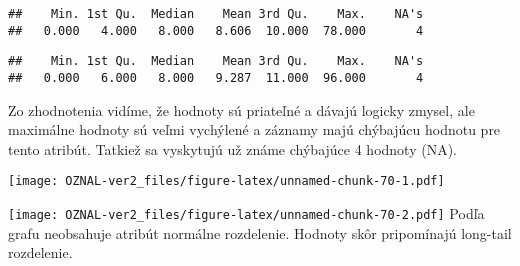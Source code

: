 \documentclass[
]{article}
\newenvironment{Shaded}{\begin{snugshade}}{\end{snugshade}}
\newcommand{\AttributeTok}[1]{\textcolor[rgb]{0.77,0.63,0.00}{#1}}
\newcommand{\FunctionTok}[1]{\textcolor[rgb]{0.00,0.00,0.00}{#1}}
\newcommand{\NormalTok}[1]{#1}
\newcommand{\SpecialCharTok}[1]{\textcolor[rgb]{0.00,0.00,0.00}{#1}}
\newcommand{\StringTok}[1]{\textcolor[rgb]{0.31,0.60,0.02}{#1}}
\begin{document}
\begin{Shaded}
\end{Shaded}

\begin{verbatim}
##    Min. 1st Qu.  Median    Mean 3rd Qu.    Max.    NA's 
##   0.000   4.000   8.000   8.606  10.000  78.000       4
\end{verbatim}

\begin{Shaded}
\end{Shaded}

\begin{verbatim}
##    Min. 1st Qu.  Median    Mean 3rd Qu.    Max.    NA's 
##   0.000   6.000   8.000   9.287  11.000  96.000       4
\end{verbatim}

Zo zhodnotenia vidíme, že hodnoty sú priateľné a dávajú logicky zmysel,
ale maximálne hodnoty sú veľmi vychýlené a záznamy majú chýbajúcu
hodnotu pre tento atribút. Tatkiež sa vyskytujú už známe chýbajúce 4
hodnoty (NA).

\begin{Shaded}
\end{Shaded}

\texttt{[image: OZNAL-ver2\_files/figure-latex/unnamed-chunk-70-1.pdf]}

\begin{Shaded}
\end{Shaded}

\texttt{[image: OZNAL-ver2\_files/figure-latex/unnamed-chunk-70-2.pdf]}
Podľa grafu neobsahuje atribút normálne rozdelenie. Hodnoty skôr
pripomínajú long-tail rozdelenie.
\end{document}
